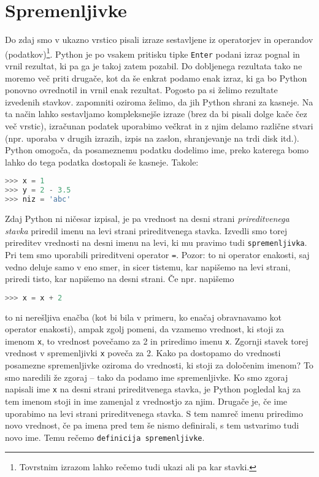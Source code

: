 \section{Spremenljivke}
Do zdaj smo v ukazno vrstico pisali izraze sestavljene iz operatorjev in operandov (podatkov)\footnote{Tovrstnim izrazom lahko rečemo tudi ukazi ali pa kar stavki.}. Python je po vsakem pritisku tipke \texttt{Enter} podani izraz pognal in vrnil rezultat, ki pa ga je takoj zatem pozabil. Do dobljenega rezultata tako ne moremo več priti drugače, kot da še enkrat podamo enak izraz, ki ga bo Python ponovno ovrednotil in vrnil enak rezultat. Pogosto pa si želimo rezultate izvedenih stavkov. zapomniti oziroma želimo, da jih Python shrani za kasneje. Na ta način lahko sestavljamo kompleksnejše izraze (brez da bi pisali dolge kače čez več vrstic), izračunan podatek uporabimo večkrat in z njim delamo različne stvari (npr. uporaba v drugih izrazih, izpis na zaslon, shranjevanje na trdi disk itd.). Python omogoča, da posameznemu podatku dodelimo ime, preko katerega bomo lahko do tega podatka dostopali še kasneje. Takole:
\begin{lstlisting}[language=Python]
>>> x = 1
>>> y = 2 - 3.5
>>> niz = 'abc'
\end{lstlisting}
Zdaj Python ni ničesar izpisal, je pa vrednost na desni strani \emph{prireditvenega stavka} priredil imenu na levi strani prireditvenega stavka. Izvedli smo torej prireditev vrednosti na desni imenu na levi, ki mu pravimo tudi \texttt{spremenljivka}. Pri tem smo uporabili prireditveni operator \texttt{=}. Pozor: to ni operator enakosti, saj vedno deluje samo v eno smer, in sicer tistemu, kar napišemo na levi strani, priredi tisto, kar napišemo na desni strani. Če npr. napišemo
\begin{lstlisting}[language=Python]
>>> x = x + 2
\end{lstlisting}
to ni nerešljiva enačba (kot bi bila v primeru, ko enačaj obravnavamo kot operator enakosti), ampak zgolj pomeni, da vzamemo vrednost, ki stoji za imenom \texttt{x}, to vrednost povečamo za 2 in priredimo imenu \texttt{x}. Zgornji stavek torej vrednost v spremenljivki \texttt{x} poveča za 2. Kako pa dostopamo do vrednosti posamezne spremenljivke oziroma do vrednosti, ki stoji za določenim imenom? To smo naredili že zgoraj -- tako da podamo ime spremenljivke. Ko smo zgoraj napisali ime \texttt{x} na desni strani prireditvenega stavka, je Python pogledal kaj za tem imenom stoji in ime zamenjal z vrednostjo za njim. Drugače je, če ime uporabimo na levi strani prireditvenega stavka. S tem namreč imenu priredimo novo vrednost, če pa imena pred tem še nismo definirali, s tem ustvarimo tudi novo ime. Temu rečemo \texttt{definicija spremenljivke}.


